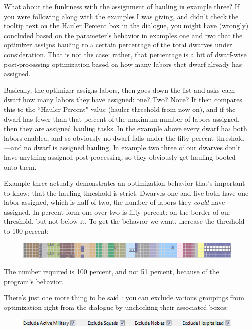 \documentclass[]{article}
\begin{document}
What about the funkiness with the assignment of hauling in example three? If you were following along
with the examples I was giving, and didn't check the tooltip text on the Hauler Percent box in the
dialogue, you might have (wrongly) concluded based on the parameter's behavior in examples one and two
that the optimizer assigns hauling to a certain percentage of the total dwarves under consideration. That
is not the case: rather, that percentage is a bit of dwarf-wise post-processing optimization based on how
many labors that dwarf already has assigned.

Basically, the optimizer assigns labors, then goes down the list and asks each dwarf how many labors they
have assigned: one? Two? None? It then compares this to the ``Hauler Percent" value (hauler threshold
from now on), and if the dwarf has fewer than that percent of the maximum number of labors assigned, then
they are assigned hauling tasks. In the example above every dwarf has both labors enabled, and so
obviously no dwarf falls under the fifty percent threshold---and no dwarf is assigned hauling. In example
two three of our dwarves don't have anything assigned post-processing, so they obviously get hauling
booted onto them.

Example three actually demonstrates an optimization behavior that's important to know: that the hauling
threshold is strict. Dwarves one and five both have one labor assigned, which is half of two, the number
of labors they \emph{could} have assigned. In percent form one over two is fifty percent: on the border
of our threshold, but not below it. To get the behavior we want, increase the threshold to 100 percent:
\begin{figure}[h!]
\centering
\includegraphics[width=\linewidth]{Sec4Fig14}
\end{figure}

The number required is 100 percent, and not 51 percent, because of the program's behavior.

There's just one more thing to be said%
: you can exclude various groupings from optimization right from the dialogue by unchecking their
associated boxes:
\begin{figure}[h!] \centering \includegraphics[scale=1]{Sec4Fig6}
\end{figure}
\end{document}
